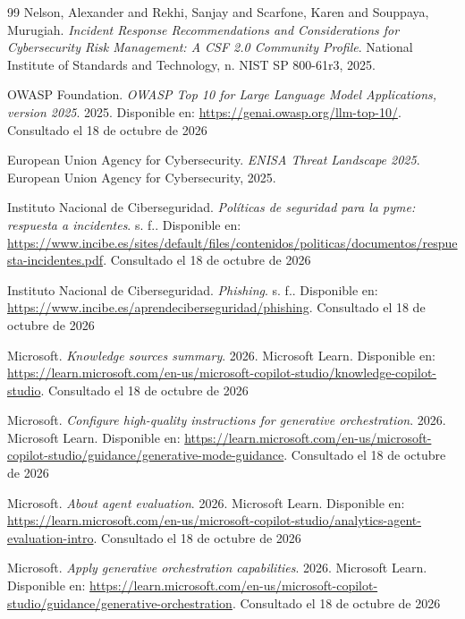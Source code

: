 \documentclass[12pt,twoside,titlepage]{book}
\begin{document}
\begin{thebibliography}{99}
 Nelson, Alexander and Rekhi, Sanjay and Scarfone, Karen and Souppaya, Murugiah. \textit{Incident Response Recommendations and Considerations for Cybersecurity Risk Management: A {CSF} 2.0 Community Profile}. National Institute of Standards and Technology, n. NIST SP 800-61r3, 2025.

 {OWASP Foundation}. \textit{{OWASP} Top 10 for Large Language Model Applications, version 2025}. 2025. Disponible en: \url{https://genai.owasp.org/llm-top-10/}. Consultado el 18 de octubre de 2026

 {European Union Agency for Cybersecurity}. \textit{{ENISA} Threat Landscape 2025}. European Union Agency for Cybersecurity, 2025.

 {Instituto Nacional de Ciberseguridad}. \textit{Políticas de seguridad para la pyme: respuesta a incidentes}. s. f.. Disponible en: \url{https://www.incibe.es/sites/default/files/contenidos/politicas/documentos/respuesta-incidentes.pdf}. Consultado el 18 de octubre de 2026

 {Instituto Nacional de Ciberseguridad}. \textit{Phishing}. s. f.. Disponible en: \url{https://www.incibe.es/aprendeciberseguridad/phishing}. Consultado el 18 de octubre de 2026

 {Microsoft}. \textit{Knowledge sources summary}. 2026. Microsoft Learn. Disponible en: \url{https://learn.microsoft.com/en-us/microsoft-copilot-studio/knowledge-copilot-studio}. Consultado el 18 de octubre de 2026

 {Microsoft}. \textit{Configure high-quality instructions for generative orchestration}. 2026. Microsoft Learn. Disponible en: \url{https://learn.microsoft.com/en-us/microsoft-copilot-studio/guidance/generative-mode-guidance}. Consultado el 18 de octubre de 2026

 {Microsoft}. \textit{About agent evaluation}. 2026. Microsoft Learn. Disponible en: \url{https://learn.microsoft.com/en-us/microsoft-copilot-studio/analytics-agent-evaluation-intro}. Consultado el 18 de octubre de 2026

 {Microsoft}. \textit{Apply generative orchestration capabilities}. 2026. Microsoft Learn. Disponible en: \url{https://learn.microsoft.com/en-us/microsoft-copilot-studio/guidance/generative-orchestration}. Consultado el 18 de octubre de 2026


\end{thebibliography}
\end{document}
